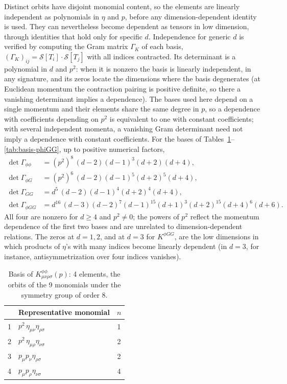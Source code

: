 \documentclass[prd,aps,preprint,nofootinbib,amsmath,amssymb,eqsecnum]{revtex4-2}
\begin{document}
Distinct orbits have disjoint monomial content, so the elements are linearly independent as
polynomials in $\eta$ and $p$, before any dimension-dependent identity is used. They can nevertheless become dependent as tensors in low dimension,
through identities that hold only for specific $d$. Independence for generic $d$ is verified by
computing the Gram matrix $\Gamma_K$ of each basis, $(\Gamma_K)_{ij}=\mathcal{S}[T_i]\cdot\mathcal{S}[T_j]$
with all indices contracted. Its determinant is a polynomial in $d$ and $p^2$: when it is
nonzero the basis is linearly independent, in any signature, and its zeros locate the
dimensions where the basis degenerates (at Euclidean momentum the contraction pairing is
positive definite, so there a vanishing determinant implies a dependence). The bases used
here depend on a single momentum and their elements share the same degree in $p$, so a
dependence with coefficients depending on $p^2$ is equivalent to one with constant
coefficients; with several independent momenta, a vanishing Gram determinant need not imply
a dependence with constant coefficients. For the bases of Tables~\ref{tab:basis-phiphi}--\ref{tab:basis-phiGG}, up to
positive numerical factors,
\begin{align}
\det\Gamma_{\phi\phi}&=(p^2)^8\,(d-2)(d-1)^3(d+2)(d+4),\\
\det\Gamma_{\phi G}&=(p^2)^6\,(d-2)(d-1)^5(d+2)^5(d+4),\\
\det\Gamma_{GG}&=d^5\,(d-2)(d-1)^4(d+2)^4(d+4),\\
\det\Gamma_{\phi GG}&=d^{16}\,(d-3)(d-2)^7(d-1)^{15}(d+1)^3(d+2)^{15}(d+4)^6(d+6).
\end{align}
All four are nonzero for $d\geq4$ and $p^2\neq0$; the powers of $p^2$ reflect the momentum
dependence of the first two bases and are unrelated to dimension-dependent relations. The
zeros at $d=1,2$, and at $d=3$ for $K^{\phi GG}$,
are the low dimensions in which products of $\eta$'s with many indices become linearly
dependent (in $d=3$, for instance, antisymmetrization over four indices vanishes).

\begin{table}[htb]
\centering
\begin{tabular}{@{}cl c@{}}
\toprule
& Representative monomial & $n$ \\
\midrule
1 & $p^2\,\eta_{\mu\nu}\eta_{\rho\sigma}$ & 1 \\
2 & $p^2\,\eta_{\mu\rho}\eta_{\nu\sigma}$ & 2 \\
3 & $p_{\mu}p_{\nu}\eta_{\rho\sigma}$ & 2 \\
4 & $p_{\mu}p_{\rho}\eta_{\nu\sigma}$ & 4 \\
\bottomrule
\end{tabular}
\caption{Basis of $K^{\phi\phi}_{\mu\nu\rho\sigma}(p)$: 4 elements, the orbits of the 9 monomials
under the symmetry group of order 8.}
\label{tab:basis-phiphi}
\end{table}
\end{document}
